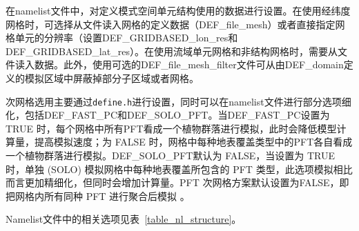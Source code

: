 \documentclass[a4paper,12pt,twoside]{article}
\begin{document}
在namelist文件中，对定义模式空间单元结构使用的数据进行设置。在使用经纬度网格时，可选择从文件读入网格的定义数据（DEF\_file\_mesh）或者直接指定网格单元的分辨率（设置DEF\_GRIDBASED\_lon\_res和DEF\_GRIDBASED\_lat\_res）。在使用流域单元网格和非结构网格时，需要从文件读入数据。此外，使用可选的DEF\_file\_mesh\_\allowbreak filter文件可从由DEF\_domain定义的模拟区域中屏蔽掉部分子区域或者网格。

次网格选用主要通过\texttt{define.h}进行设置，同时可以在namelist文件进行部分选项细化，包括DEF\_FAST\_PC和DEF\_SOLO\_PFT。当DEF\_FAST\_PC设置为 TRUE 时，每个网格中所有PFT看成一个植物群落进行模拟，此时会降低模型计算量，提高模拟速度；为 FALSE 时，网格中每种地表覆盖类型中的PFT各自看成一个植物群落进行模拟。DEF\_SOLO\_PFT默认为 FALSE，当设置为 TRUE 时，单独 (SOLO) 模拟网格中每种地表覆盖所包含的 PFT 类型，此选项模拟相比而言更加精细化，但同时会增加计算量。PFT 次网格方案默认设置为FALSE，即把网格内所有同种 PFT 进行聚合后模拟 。

Namelist文件中的相关选项见表~\ref{table_nl_structure}。
\end{document}
